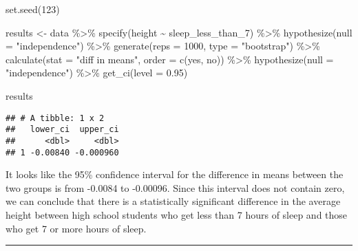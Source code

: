 \documentclass[
]{article}
\newenvironment{Shaded}{\begin{snugshade}}{\end{snugshade}}
\newcommand{\AttributeTok}[1]{\textcolor[rgb]{0.77,0.63,0.00}{#1}}
\newcommand{\DecValTok}[1]{\textcolor[rgb]{0.00,0.00,0.81}{#1}}
\newcommand{\FloatTok}[1]{\textcolor[rgb]{0.00,0.00,0.81}{#1}}
\newcommand{\FunctionTok}[1]{\textcolor[rgb]{0.00,0.00,0.00}{#1}}
\newcommand{\NormalTok}[1]{#1}
\newcommand{\OtherTok}[1]{\textcolor[rgb]{0.56,0.35,0.01}{#1}}
\newcommand{\SpecialCharTok}[1]{\textcolor[rgb]{0.00,0.00,0.00}{#1}}
\newcommand{\StringTok}[1]{\textcolor[rgb]{0.31,0.60,0.02}{#1}}
\begin{document}
\begin{Shaded}
\begin{Highlighting}[]
\FunctionTok{set.seed}\NormalTok{(}\DecValTok{123}\NormalTok{)}

\NormalTok{results }\OtherTok{\textless{}{-}}\NormalTok{ data }\SpecialCharTok{\%\textgreater{}\%} 
  \FunctionTok{specify}\NormalTok{(height }\SpecialCharTok{\textasciitilde{}}\NormalTok{ sleep\_less\_than\_7) }\SpecialCharTok{\%\textgreater{}\%}
  \FunctionTok{hypothesize}\NormalTok{(}\AttributeTok{null =} \StringTok{"independence"}\NormalTok{) }\SpecialCharTok{\%\textgreater{}\%}
  \FunctionTok{generate}\NormalTok{(}\AttributeTok{reps =} \DecValTok{1000}\NormalTok{, }\AttributeTok{type =} \StringTok{"bootstrap"}\NormalTok{) }\SpecialCharTok{\%\textgreater{}\%}
  \FunctionTok{calculate}\NormalTok{(}\AttributeTok{stat =} \StringTok{"diff in means"}\NormalTok{, }\AttributeTok{order =} \FunctionTok{c}\NormalTok{(}\StringTok{\textquotesingle{}yes\textquotesingle{}}\NormalTok{, }\StringTok{\textquotesingle{}no\textquotesingle{}}\NormalTok{)) }\SpecialCharTok{\%\textgreater{}\%}
  \FunctionTok{hypothesize}\NormalTok{(}\AttributeTok{null =} \StringTok{"independence"}\NormalTok{) }\SpecialCharTok{\%\textgreater{}\%}
  \FunctionTok{get\_ci}\NormalTok{(}\AttributeTok{level =} \FloatTok{0.95}\NormalTok{)}

\NormalTok{results}
\end{Highlighting}
\end{Shaded}

\begin{verbatim}
## # A tibble: 1 x 2
##   lower_ci  upper_ci
##      <dbl>     <dbl>
## 1 -0.00840 -0.000960
\end{verbatim}

It looks like the 95\% confidence interval for the difference in means
between the two groups is from -0.0084 to -0.00096. Since this interval
does not contain zero, we can conclude that there is a statistically
significant difference in the average height between high school
students who get less than 7 hours of sleep and those who get 7 or more
hours of sleep.

\begin{center}\rule{0.5\linewidth}{0.5pt}\end{center}
\end{document}
